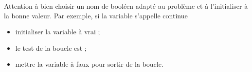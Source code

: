 				Attention à bien choisir un nom de booléen 
				adapté au problème
				et à l'initialiser à la bonne valeur. 
				Par exemple, si la variable s'appelle \og{}continue\fg{}
				\begin{itemize}
				\item initialiser la variable à vrai ;
				\item le test de la boucle est \og{}\fg{} ;
				\item mettre la variable à faux pour sortir de la boucle.
				\end{itemize}
		
	
